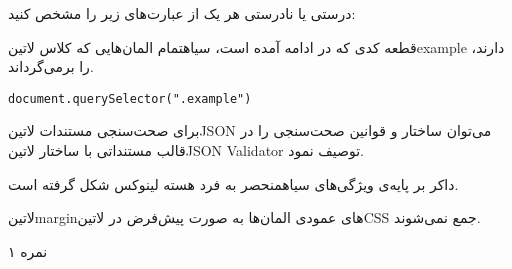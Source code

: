 
درستی یا نادرستی هر یک از عبارت‌های زیر را مشخص کنید:


 قطعه کدی که در ادامه آمده است، ‌سیاه{تمام} المان‌هایی که کلاس ‌لاتین{example} دارند، را برمی‌گرداند.

\begin{latin}
\begin{verbatim}
document.querySelector(".example")
\end{verbatim}
\end{latin}

 برای صحت‌سنجی مستندات ‌لاتین{JSON} می‌توان ساختار و قوانین صحت‌سنجی را در قالب مستنداتی با ساختار ‌لاتین{JSON Validator} توصیف نمود.

 داکر بر پایه‌ی ویژگی‌های ‌سیاه{منحصر به فرد} هسته لینوکس شکل گرفته است.

 ‌لاتین{margin}های عمودی المان‌ها به صورت پیش‌فرض در ‌لاتین{CSS} جمع نمی‌شوند.



۱ نمره
